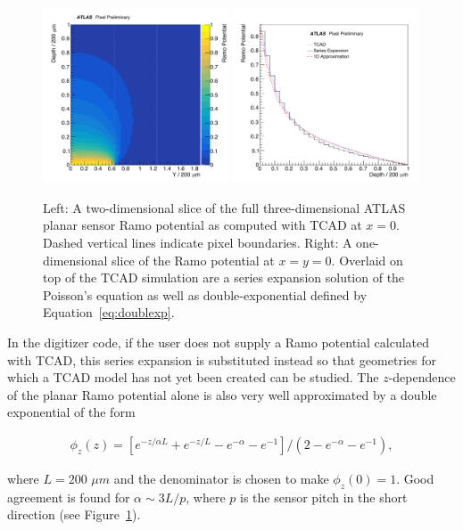 \begin{figure}[!htpb]
\centering
\includegraphics[width=0.49\textwidth]{newtest_ramoxz_10.pdf}
\includegraphics[width=0.49\textwidth]{newtest_ramoz_10.pdf}
\caption{Left: A two-dimensional slice of the full three-dimensional ATLAS planar sensor Ramo potential as computed with TCAD at $x=0$.  Dashed vertical lines indicate pixel boundaries.  Right: A one-dimensional slice of the Ramo potential at $x=y=0$.  Overlaid on top of the TCAD simulation are a series expansion solution of the Poisson's equation as well as double-exponential defined by Equation~\ref{eq:doublexp}.}
\label{fig:ramo:planar}
\end{figure}

In the digitizer code, if the user does not supply a Ramo potential calculated with TCAD, this series expansion is substituted instead so that geometries for which a TCAD model has not yet been created can be studied.  The $z$-dependence of the planar Ramo potential alone is also very well approximated by a double exponential of the form 

\begin{align}
\label{eq:doublexp}
\phi_z(z)=[e^{-z/\alpha L}+e^{-z/L}-e^{-\alpha}-e^{-1}]/(2-e^{-\alpha}-e^{-1}),
\end{align}

where $L=200$ $\mu m$ and the denominator is chosen to make $\phi_z(0)=1$.  Good agreement is found for $\alpha\sim 3L/p$, where $p$ is the sensor pitch in the short direction (see Figure~\ref{fig:ramo:planar}). 


